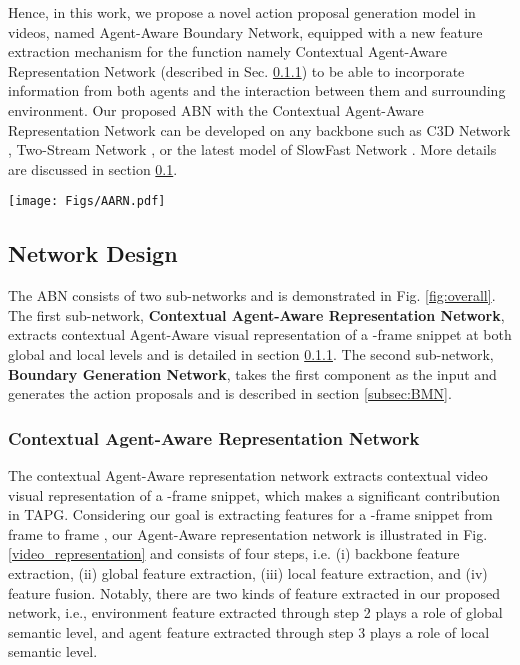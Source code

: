 \documentclass{ieeeaccess}
\begin{document}
Hence, in this work, we propose a novel action proposal generation model in videos, named Agent-Aware Boundary Network, equipped with a new feature extraction mechanism for the function  namely Contextual Agent-Aware Representation Network (described in Sec. \ref{subsec:representation}) to be able to incorporate information from both agents and the interaction between them and surrounding environment. Our proposed ABN with the Contextual Agent-Aware Representation Network can be developed on any backbone such as C3D Network \cite{C3D_3}, Two-Stream Network \cite{2_stream_1}, or the latest model of SlowFast Network \cite{SlowFast}. More details are discussed in section \ref{sub:CAE feature}.



\begin{figure*}[ht!]
  \begin{center}
  \texttt{[image: Figs/AARN.pdf]}
  \caption{An overall architecture of our proposed contextual Agent-Aware representation network which contains four steps. Given a -frame snippet, the final video visual feature is conducted by both global feature and local feature.}
  \label{video_representation}
  \end{center}
\end{figure*}

\subsection{Network Design}
\label{sub:CAE feature}
The ABN consists of two sub-networks and is demonstrated in Fig. \ref{fig:overall}. The first sub-network, \textbf{Contextual Agent-Aware Representation Network}, extracts contextual Agent-Aware visual representation of a -frame snippet at both global and local levels and is detailed in section \ref{subsec:representation}.
The second sub-network, \textbf{Boundary Generation Network}, takes the first component as the input and generates the action proposals and is described in section \ref{subsec:BMN}.

\subsubsection{Contextual Agent-Aware Representation Network}
\label{subsec:representation} 
The contextual Agent-Aware representation network extracts contextual video visual representation of a -frame snippet, which makes a significant contribution in TAPG. Considering our goal is extracting features for a -frame snippet from frame  to frame , our Agent-Aware representation network is illustrated in Fig. \ref{video_representation} and consists of four steps, i.e. (i) backbone feature extraction, (ii) global feature extraction, (iii) local feature extraction, and (iv) feature fusion. Notably, there are two kinds of feature extracted in our proposed network, i.e., environment feature extracted through step 2 plays a role of global semantic level, and agent feature extracted through step 3 plays a role of local semantic level.
\end{document}
